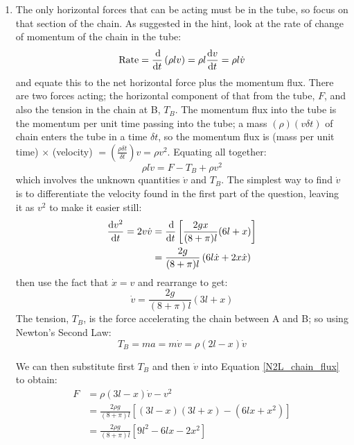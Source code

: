 \begin{hint}
{\begin{enumerate}
	\item The only horizontal forces that can be acting must be in the tube, so focus on that section of the chain. As suggested in the hint, look at the rate of change of momentum of the chain in the tube:
\begin{equation*} \textrm{Rate} = \frac{\operatorname{d}\!}{\operatorname{d}\! t}\left(\rho l v\right) = \rho l \frac{\operatorname{d}\! v}{\operatorname{d}\! t} = \rho l \dot{v} \end{equation*}
and equate this to the net horizontal force plus the momentum flux. There are two forces acting; the horizontal component of that from the tube, $F$, and also the tension in the chain at B, $T_{B}$. The momentum flux into the tube is the momentum per unit time passing into the tube; a mass $(\rho)(v\delta t)$ of chain enters the tube in a time $\delta t$, so the momentum flux is (mass per unit time) $\times$ (velocity) $= \left(\frac{\rho \delta t}{\delta t}\right) v = \rho v^{2}$.
Equating all together:
\begin{equation} \rho l \dot{v} = F - T_{B} + \rho v^{2} \label{N2L_chain_flux}\end{equation}
which involves the unknown quantities $\dot{v}$ and $T_{B}$. The simplest way to find $\dot{v}$ is to differentiate the velocity found in the first part of the question, leaving it as $v^{2}$ to make it easier still:
\begin{align*} \frac{\operatorname{d}\! v^{2}}{\operatorname{d}\! t} = 2v\dot{v} &= \frac{\operatorname{d}\!}{\operatorname{d}\! t} \left[\frac{2gx}{(8 + \pi)l}(6l + x)\right] \\ &= \frac{2g}{(8 + \pi)l}\left(6l\dot{x} + 2x\dot{x}\right) \end{align*}
then use the fact that $\dot{x} = v$ and rearrange to get:
\begin{equation*} \dot{v} = \frac{2g}{(8 + \pi)l}\left(3l + x\right) \end{equation*}
The tension, $T_{B}$, is the force accelerating the chain between A and B; so using Newton's Second Law:
\begin{equation*} T_{B} = ma = m\dot{v} = \rho(2l - x)\dot{v} \end{equation*}

We can then substitute first $T_{B}$ and then $\dot{v}$ into Equation \eqref{N2L_chain_flux} to obtain:
\begin{align*} F &= \rho(3l - x)\dot{v} - v^{2} \\ &= \frac{2\rho g}{(8 + \pi)l}\left[(3l - x)(3l + x) - (6lx + x^{2})\right] \\ &= \frac{2\rho g}{(8 + \pi)l}\left[9l^{2} - 6lx - 2x^{2}\right] \end{align*}
\end{enumerate}
}
\end{hint}